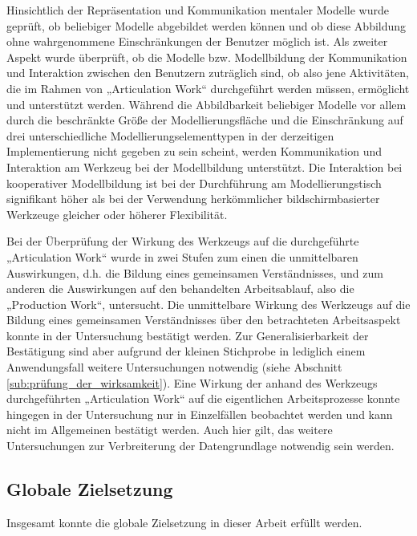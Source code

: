 Hinsichtlich der Repräsentation und Kommunikation mentaler Modelle wurde geprüft, ob beliebiger Modelle abgebildet werden können und ob diese Abbildung ohne wahrgenommene Einschränkungen der Benutzer möglich ist. Als zweiter Aspekt wurde überprüft, ob die Modelle bzw. Modellbildung der Kommunikation und Interaktion zwischen den Benutzern zuträglich sind, ob also jene Aktivitäten, die im Rahmen von „Articulation Work“ durchgeführt werden müssen, ermöglicht und unterstützt werden. Während die Abbildbarkeit beliebiger Modelle vor allem durch die beschränkte Größe der Modellierungsfläche und die Einschränkung auf drei unterschiedliche Modellierungselementtypen in der derzeitigen Implementierung nicht gegeben zu sein scheint, werden Kommunikation und Interaktion am Werkzeug bei der Modellbildung unterstützt. Die Interaktion bei kooperativer Modellbildung ist bei der Durchführung am Modellierungstisch signifikant höher als bei der Verwendung herkömmlicher bildschirmbasierter Werkzeuge gleicher oder höherer Flexibilität.

Bei der Überprüfung der Wirkung des Werkzeugs auf die durchgeführte „Articulation Work“ wurde in zwei Stufen zum einen die unmittelbaren Auswirkungen, d.h. die Bildung eines gemeinsamen Verständnisses, und zum anderen die Auswirkungen auf den behandelten Arbeitsablauf, also die „Production Work“, untersucht. Die unmittelbare Wirkung des Werkzeugs auf die Bildung eines gemeinsamen Verständnisses über den betrachteten Arbeitsaspekt konnte in der Untersuchung bestätigt werden. Zur Generalisierbarkeit der Bestätigung sind aber aufgrund der kleinen Stichprobe in lediglich einem Anwendungsfall weitere Untersuchungen notwendig (siehe Abschnitt \ref{sub:prüfung_der_wirksamkeit}). Eine Wirkung der anhand des Werkzeugs durchgeführten „Articulation Work“ auf die eigentlichen Arbeitsprozesse konnte hingegen in der Untersuchung nur in Einzelfällen beobachtet werden und kann nicht im Allgemeinen bestätigt werden. Auch hier gilt, das weitere Untersuchungen zur Verbreiterung der Datengrundlage notwendig sein werden.

\subsection{Globale Zielsetzung} %
\label{sub:globale_zielsetzung}

Insgesamt konnte die globale Zielsetzung in dieser Arbeit erfüllt werden. 

